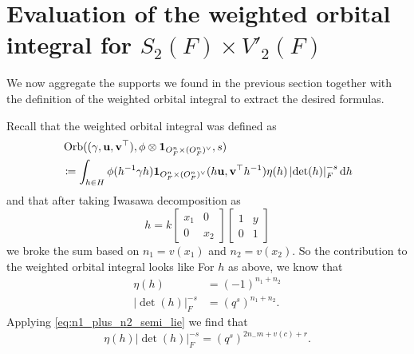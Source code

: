 \chapter{Evaluation of the weighted orbital integral for $S_2(F) \times V'_2(F)$}
\label{ch:orbitalFJ2}

We now aggregate the supports we found in the previous section together with the
definition of the weighted orbital integral to extract the desired formulas.

Recall that the weighted orbital integral was defined as
\begin{align*}
  & \Orb(\guv, \phi \otimes \oneV, s) \\
  &\coloneqq
  \int_{h \in H} \phi(h\inv \gamma h)
  \oneV(h \uu, \vv^\top h^{-1})
  \eta(h) \left\lvert \det(h) \right\rvert_F^{-s} \odif h
\end{align*}
and that after taking Iwasawa decomposition as
\[ h = k \begin{bmatrix} x_1 & 0 \\ 0 & x_2 \end{bmatrix}
  \begin{bmatrix} 1 & y \\ 0 & 1 \end{bmatrix} \]
we broke the sum based on $n_1 = v(x_1)$ and $n_2 = v(x_2)$.
So the contribution to the weighted orbital integral looks like
For $h$ as above, we know that
\begin{align*}
  \eta(h) &= (-1)^{n_1 + n_2} \\
  \left\lvert \det(h) \right\rvert^{-s}_F &= (q^s)^{n_1 + n_2}.
\end{align*}
Applying \eqref{eq:n1_plus_n2_semi_lie} we find that
\[
  \eta(h)
  \left\lvert \det(h) \right\rvert^{-s}_F
  = (q^s)^{2n_ - m + v(c) + r}.
\]

